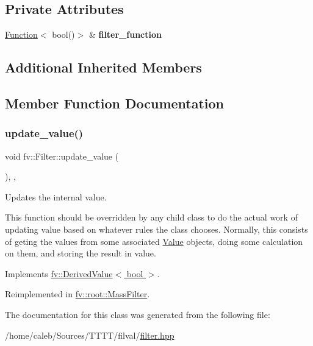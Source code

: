 \subsection*{Private Attributes}
\begin{DoxyCompactItemize}
\item 
\hypertarget{classfv_1_1Filter_a0c8d620dcf75608a8afaf2e34c773e3f}{}\label{classfv_1_1Filter_a0c8d620dcf75608a8afaf2e34c773e3f} 
\hyperlink{classfv_1_1Function}{Function}$<$ bool()$>$ \& {\bfseries filter\+\_\+function}
\end{DoxyCompactItemize}
\subsection*{Additional Inherited Members}


\subsection{Member Function Documentation}
\hypertarget{classfv_1_1Filter_ab3ed620127ccb32f75bc5e78bc8a60b3}{}\label{classfv_1_1Filter_ab3ed620127ccb32f75bc5e78bc8a60b3} 
\subsubsection{\texorpdfstring{update\+\_\+value()}{update\_value()}}
{\footnotesize\ttfamily void fv\+::\+Filter\+::update\+\_\+value (\begin{DoxyParamCaption}{ }\end{DoxyParamCaption})\hspace{0.3cm}{\ttfamily [inline]}, {\ttfamily [private]}, {\ttfamily [virtual]}}



Updates the internal value. 

This function should be overridden by any child class to do the actual work of updating value based on whatever rules the class chooses. Normally, this consists of geting the values from some associated \hyperlink{classfv_1_1Value}{Value} objects, doing some calculation on them, and storing the result in value. 

Implements \hyperlink{classfv_1_1DerivedValue_ae59e80a98eb74b95d8961bfe12ee5ec2}{fv\+::\+Derived\+Value$<$ bool $>$}.



Reimplemented in \hyperlink{classfv_1_1root_1_1MassFilter_a1a8b086086e1220bc352523184d3f1c2}{fv\+::root\+::\+Mass\+Filter}.



The documentation for this class was generated from the following file\+:\begin{DoxyCompactItemize}
\item 
/home/caleb/\+Sources/\+T\+T\+T\+T/filval/\hyperlink{filter_8hpp}{filter.\+hpp}\end{DoxyCompactItemize}

